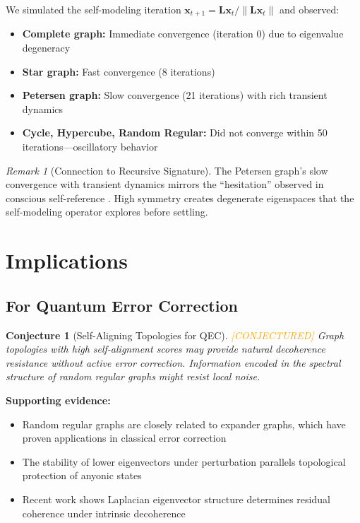 \documentclass[11pt,a4paper]{article}
\newtheorem{conjecture}[theorem]{Conjecture}
\theoremstyle{definition}
\theoremstyle{remark}
\newtheorem{remark}[theorem]{Remark}
\newcommand{\norm}[1]{\| #1 \|}
\newcommand{\Lap}{\mathbf{L}}
\newcommand{\conjectured}{\textcolor{orange}{[CONJECTURED]}}
\begin{document}
We simulated the self-modeling iteration $\mathbf{x}_{t+1} = \Lap \mathbf{x}_t / \norm{\Lap \mathbf{x}_t}$ and observed:

\begin{itemize}
    \item \textbf{Complete graph:} Immediate convergence (iteration 0) due to eigenvalue degeneracy
    \item \textbf{Star graph:} Fast convergence (8 iterations)
    \item \textbf{Petersen graph:} Slow convergence (21 iterations) with rich transient dynamics
    \item \textbf{Cycle, Hypercube, Random Regular:} Did not converge within 50 iterations---oscillatory behavior
\end{itemize}

\begin{remark}[Connection to Recursive Signature]
The Petersen graph's slow convergence with transient dynamics mirrors the ``hesitation'' observed in conscious self-reference \cite{benshalom2026recursive}. High symmetry creates degenerate eigenspaces that the self-modeling operator explores before settling.
\end{remark}

\section{Implications}
\label{sec:implications}

\subsection{For Quantum Error Correction}

\begin{conjecture}[Self-Aligning Topologies for QEC] \conjectured
\label{conj:qec}
Graph topologies with high self-alignment scores may provide natural decoherence resistance without active error correction. Information encoded in the spectral structure of random regular graphs might resist local noise.
\end{conjecture}

\textbf{Supporting evidence:}
\begin{itemize}
    \item Random regular graphs are closely related to expander graphs, which have proven applications in classical error correction
    \item The stability of lower eigenvectors under perturbation parallels topological protection of anyonic states
    \item Recent work shows Laplacian eigenvector structure determines residual coherence under intrinsic decoherence \cite{arxiv2512coherence}
\end{itemize}
\end{document}
